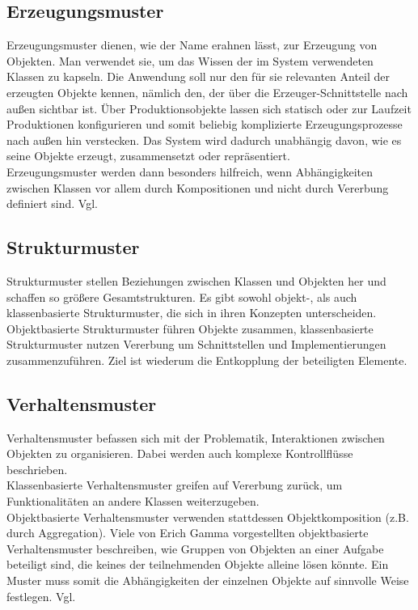 \documentclass[fontsize=11pt,a4paper,final]{scrreprt}[2003/01/01]
\begin{document}
\subsection{Erzeugungsmuster}\label{se:Erzeugungsmuster}

Erzeugungsmuster dienen, wie der Name erahnen lässt, zur Erzeugung von Objekten. Man verwendet sie, um das Wissen der im System verwendeten Klassen zu kapseln. Die Anwendung soll nur den für sie relevanten Anteil der erzeugten Objekte kennen, nämlich den, der über die Erzeuger-Schnittstelle nach außen sichtbar ist. Über Produktionsobjekte lassen sich statisch oder zur Laufzeit Produktionen konfigurieren und somit beliebig komplizierte Erzeugungsprozesse nach außen hin verstecken. Das System wird dadurch unabhängig davon, wie es seine Objekte erzeugt, zusammensetzt oder repräsentiert. 
\\
Erzeugungsmuster werden dann besonders hilfreich, wenn Abhängigkeiten zwischen Klassen vor allem durch Kompositionen und nicht durch Vererbung definiert sind. Vgl. \cite[S. 101]{gamma2004}

\subsection{Strukturmuster}\label{se:Strukturmuster}

Strukturmuster stellen Beziehungen zwischen Klassen und Objekten her und schaffen so größere Gesamtstrukturen. Es gibt sowohl objekt-, als auch klassenbasierte Strukturmuster, die sich in ihren Konzepten unterscheiden. Objektbasierte Strukturmuster führen Objekte zusammen, klassenbasierte Strukturmuster nutzen Vererbung um Schnittstellen und Implementierungen zusammenzuführen. Ziel ist wiederum die Entkopplung der beteiligten Elemente.

\subsection{Verhaltensmuster}\label{se:Verhaltensmuster}

Verhaltensmuster befassen sich mit der Problematik, Interaktionen zwischen Objekten zu organisieren. Dabei werden auch komplexe Kontrollflüsse beschrieben. \\
Klassenbasierte Verhaltensmuster greifen auf Vererbung zurück, um Funktionalitäten an andere Klassen weiterzugeben. \\
Objektbasierte Verhaltensmuster verwenden stattdessen Objektkomposition (z.B. durch Aggregation). Viele von Erich Gamma vorgestellten objektbasierte Verhaltensmuster beschreiben, wie Gruppen von Objekten an einer Aufgabe beteiligt sind, die keines der teilnehmenden Objekte alleine lösen könnte. Ein Muster muss somit die Abhängigkeiten der einzelnen Objekte auf sinnvolle Weise festlegen. Vgl. \cite[S. 271]{gamma2004}
\end{document}
